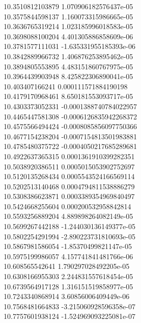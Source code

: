 {10.3510812103879 1.070906182576437e-05 \\
10.3575844598137 1.160073315986665e-05 \\
10.3636765319214 1.023185996018583e-05 \\
10.3698088100204 4.401305886858609e-06 \\
10.3781577111031 -1.635331955185393e-06 \\
10.3842889966732 1.406876253895462e-05 \\
10.3894805553895 4.483151860767975e-05 \\
10.3964439903948 8.425822306890041e-05 \\
10.403407166241 0.000111571884190198 \\
10.4179170968461 8.650181553093717e-05 \\
10.4303373052331 -0.0001388740784022957 \\
10.4465447581308 -0.0006126835942268372 \\
10.4575566494424 -0.0008085856097750366 \\
10.4677154238204 -0.0007154813501983881 \\
10.4785480375722 -0.0004050217685289681 \\
10.4922637365315 0.0001361910399282351 \\
10.5038920386511 0.0005015053902752697 \\
10.5120135268434 0.0005543524166569114 \\
10.5202513140468 0.0004794811538886279 \\
10.5308386623871 0.0003389354969840497 \\
10.5424668255604 0.000200532958842814 \\
10.5593256889204 4.889898264082149e-05 \\
10.5699267442188 -1.244030136149377e-05 \\
10.5802254291994 -2.890223731810693e-05 \\
10.5867981586054 -1.85370499821147e-05 \\
10.5975199986057 4.157741841481766e-06 \\
10.608565542641 1.790297028492205e-05 \\
10.6308166955303 2.244831557618454e-05 \\
10.6739564917128 1.316151519858977e-05 \\
10.7243340868914 3.60856006409449e-06 \\
10.7568481664833 -3.215060928596358e-07 \\
10.7757601938124 -1.524969093225081e-07 \\
}
